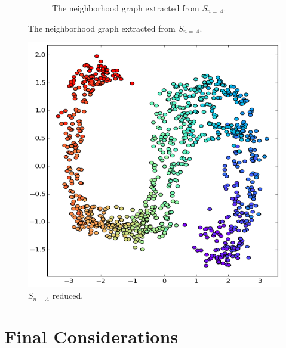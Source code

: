 \documentclass[12pt]{article}
\begin{document}
\begin{description}
\begin{figure}[H]
\begin{subfigure}{.6\linewidth}
			\captionsetup{justification=centering}
			\caption{The neighborhood graph extracted from $S_{n=.4}$.}					
		\end{subfigure}
	\end{figure}
	\begin{figure}[H]
		\centering
	    \includegraphics[width=.4\linewidth]{img/noise/s/5_0_20-reduced}
		\captionsetup{justification=centering}
		\caption{$S_{n=.4}$ reduced.}
	\end{figure}
\end{description}

\section{Final Considerations}

\newpage



\end{document}
